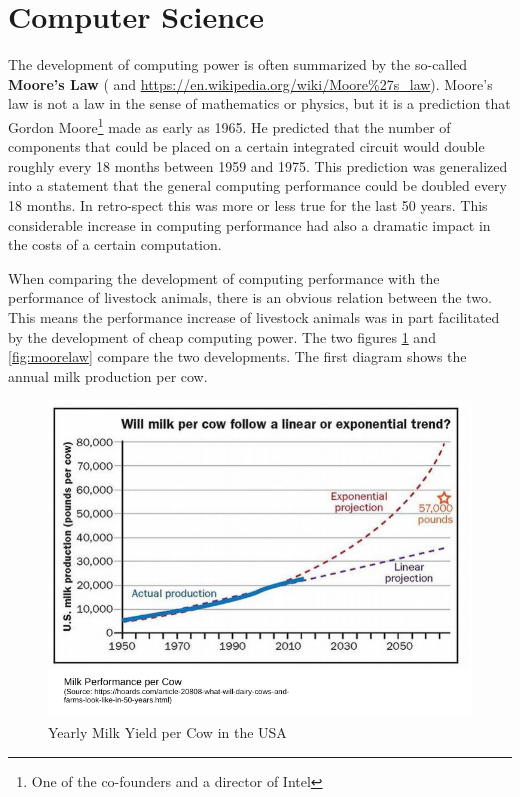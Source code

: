 \documentclass[
]{book}
\begin{document}
\hypertarget{computerscience}{%
\section{Computer Science}\label{computerscience}}

The development of computing power is often summarized by the so-called \textbf{Moore's Law} (\citep{Moore1965} and \url{https://en.wikipedia.org/wiki/Moore\%27s_law}). Moore's law is not a law in the sense of mathematics or physics, but it is a prediction that Gordon Moore\footnote{One of the co-founders and a director of Intel} made as early as 1965. He predicted that the number of components that could be placed on a certain integrated circuit would double roughly every 18 months between 1959 and 1975. This prediction was generalized into a statement that the general computing performance could be doubled every 18 months. In retro-spect this was more or less true for the last 50 years. This considerable increase in computing performance had also a dramatic impact in the costs of a certain computation.

When comparing the development of computing performance with the performance of livestock animals, there is an obvious relation between the two. This means the performance increase of livestock animals was in part facilitated by the development of cheap computing power. The two figures \ref{fig:milkcompperf} and \ref{fig:moorelaw} compare the two developments. The first diagram shows the annual milk production per cow.

\begin{figure}[!ht]
\includegraphics[width=7.42in,]{odg/milkcompperf} \caption{Yearly Milk Yield per Cow in the USA}\label{fig:milkcompperf}
\end{figure}
\end{document}
